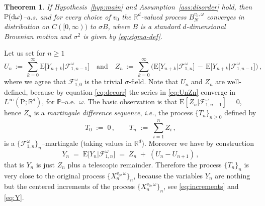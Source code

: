 \documentclass[a4paper,reqno,11pt]{amsart}
\numberwithin{equation}{section}
\newtheorem{theorem}{Theorem}[section]
\newcommand{\bbP}{{\ensuremath{\mathbb P}} }
\newcommand{\cF}{{\ensuremath{\mathcal F}} }
\newcommand{\gs}{\sigma}
\newcommand{\go}{\omega}
\newcommand{\dd}{\text{\rm d}}             %
\newcommand{\R}{\mathbb{R}}
\def\bP{\ensuremath{\bs{\mathrm{P}}}}
\def\bE{\ensuremath{\bs{\mathrm{E}}}}
\def\bs{\boldsymbol}
\begin{document}
\medskip
\begin{theorem}
\label{th:inv-princ}
If Hypothesis~\ref{hyp:main} and Assumption~\ref{ass:disorder} hold,
then $\bbP(\dd \go)$--a.s. and for every choice of $v_0$
the $\R^d$-valued process $B^{v_0,\omega}_{N}$
converges in distribution on $C([0, \infty))$ to $\gs B$,
where $B$ is a standard $d$-dimensional Brownian motion
and $\gs^2$ is given by \eqref{eq:sigma-def}.
\end{theorem}

\smallskip


Let us set for $n \ge 1$
\begin{equation} \label{eq:UnZn}
U_n \,:=\, \sum_{k=0}^\infty \bE \big[ Y_{n+k}  \big| \cF_{1,n-1}^\go \big]
\quad \text{and} \quad
Z_n \,:=\, \sum_{k=0}^\infty \big( \bE \big[ Y_{n+k} \big| \cF_{1,n}^\go \big]
\,-\, \bE\big[Y_{n+k} \big| \cF_{1,n-1}^\go\big] \big)\,,
\end{equation}
where we agree that $\cF_{1,0}^\go$ is the trivial $\gs$-field.
Note that $U_n$ and $Z_n$ are well-defined, because by equation \eqref{eq:decorr}
the series in \eqref{eq:UnZn} converge in $L^\infty(\bP;\R^d)$,
for $\bbP$--a.e.~$\go$.
The basic observation is that $\bE[Z_n|\cF_{1,n-1}^\go] = 0$,
hence $Z_n$ is a {\sl martingale difference sequence}, {\sl i.e.},
the process $\{T_n\}_{n \ge 0}$ defined by
\begin{equation} \label{eq:Tn}
	T_0 \;:=\; 0 \,, \qquad T_n \;:=\; \sum_{i=1}^n Z_i\,,
\end{equation}
is a $\{\cF^\go_{1,n}\}_n$--martingale (taking values in $\R^d$).
Moreover we have by construction
\begin{equation} \label{eq:telescopic}
Y_n  \;=\; \bE \big[ Y_n \big| \cF_{1,n}^\go \big] \;=\; Z_n \;+\;
(U_n - U_{n+1})\,,
\end{equation}
that is $Y_n$ is just $Z_n$ plus a telescopic remainder.
Therefore the process $\{T_n\}_n$ is very close to the original process $\{X^{v_0,\go}_n\}_n$,
because the variables $Y_n$ are nothing but the centered increments of the process
$\{X^{v_0, \go}_n\}_n$, see \eqref{eq:increments} and \eqref{eq:Y}.
\end{document}
